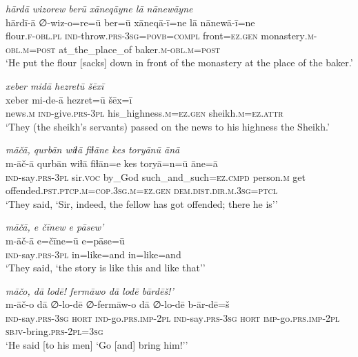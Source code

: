 \ea \label{HB.73}
\textit{hārdā wizorew berū xāneqāyne lā nānewāyne} \\ 
\gll hārdī-ā ∅-wiz-o=re=ū ber=ū xāneqā-ī=ne lā nānewā-ī=ne \\ 
 flour\textsc{\textsc{.f}}\textsc{-obl}\textsc{.pl} \textsc{ind-}throw\textsc{.prs}\textsc{-3sg}\textsc{=\textsc{povb}}=\textsc{compl} front\textsc{=ez}\textsc{.gen} monastery\textsc{.m}\textsc{-obl}\textsc{.m}\textsc{=\textsc{post}} at\_the\_place\_of baker\textsc{.m}\textsc{-obl}\textsc{.m}\textsc{=\textsc{post}} \\ 
\glt `He put the flour [sacks] down in front of the monastery at the place of the baker.'
\z 
 
\ea \label{HB.75}
\textit{xeber midā hezretū šēxī} \\ 
\gll xeber mi-de-ā hezret=ū šēx=ī \\ 
 news\textsc{.m} \textsc{ind-}give\textsc{.prs}\textsc{-3pl} his\_highness\textsc{.m}\textsc{=ez}\textsc{.gen} sheikh\textsc{.m}\textsc{=ez}.\textsc{attr} \\ 
\glt `They (the sheikh’s servants) passed on the news to his highness the Sheikh.'
\z 
 
\ea \label{HB.76}
\textit{māčā, qurbān wiɫā fiɫāne kes toryānū ānā} \\ 
\gll m-āč-ā qurbān wiɫā fiɫān=e kes toryā=n=ū āne=ā \\ 
 \textsc{ind-}say\textsc{.prs}\textsc{-3pl} sir.\textsc{voc} by\_God such\_and\_such\textsc{=ez}\textsc{.cmpd} person\textsc{.m} get offended\textsc{.pst}\textsc{.ptcp}\textsc{.m}\textsc{=cop}\textsc{.3sg}\textsc{.m}\textsc{=ez}\textsc{.gen} \textsc{dem.dist}\textsc{.dir}\textsc{.m}\textsc{.3sg}=\textsc{ptcl} \\ 
\glt `They said, ‘Sir, indeed, the fellow has got offended; there he is’'
\z 
 
\ea \label{HB.77}
\textit{māčā, e čīnew e pāsew’} \\ 
\gll m-āč-ā e=čīne=ū e=pāse=ū \\ 
 \textsc{ind-}say\textsc{.prs}\textsc{-3pl} in=like=and in=like=and \\ 
\glt `They said, ‘the story is like this and like that’'
\z 
 
\ea \label{HB.79}
\textit{māčo, dā lodē! fermāwo dā lodē bārdēš!’} \\ 
\gll m-āč-o dā ∅-lo-dē ∅-fermāw-o dā ∅-lo-dē b-ār-dē=š \\ 
 \textsc{ind-}say\textsc{.prs}\textsc{-3sg} \textsc{hort} \textsc{ind-}go\textsc{.prs}\textsc{.imp}\textsc{-2pl} \textsc{ind-}say\textsc{.prs}\textsc{-3sg} \textsc{hort} \textsc{imp-}go\textsc{.prs}\textsc{.imp}\textsc{-2pl} \textsc{sbjv-}bring\textsc{.prs}\textsc{-2pl}\textsc{=3sg} \\ 
\glt `He said [to his men] ‘Go [and] bring him!’'
\z 
 
